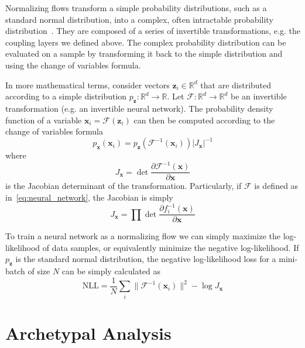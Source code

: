 Normalizing flows transform a simple probability distributions, such as a
standard normal distribution, into a complex, often intractable probability
distribution~\citep{kobyzevNormalizingFlowsIntroduction2020}. They are composed
of a series of invertible transformations, e.g. the coupling layers we defined
above. The complex probability distribution can be evaluated on a sample by
transforming it back to the simple distribution and using the change of
variables formula.

In more mathematical terms, consider vectors $\mathbf{z}_i \in \mathbb{R}^d$
that are distributed according to a simple distribution $p_{\mathbf{z}}:
\mathbb{R}^d \rightarrow \mathbb{R}$. Let $\mathcal{F}: \mathbb{R}^d
\rightarrow \mathbb{R}^d$ be an invertible transformation (e.g. an invertible
neural network). The probability density function of a variable $\mathbf{x}_i =
\mathcal{F} (\mathbf{z}_i)$ can then be computed according to the change of
variables formula
\begin{equation}%
    \label{eq:change_of_variables}
    p_{\mathbf{x}}(\mathbf{x}_i) =
    p_{\mathbf{z}}(\mathcal{F}^{-1}(\mathbf{x}_i)) \lvert J_{\mathbf{x}} \rvert^{-1}
\end{equation}
where
\begin{equation}%
    \label{eq:jacobian_det}
    J_{\mathbf{x}} = \det \frac{\partial \mathcal{F}^{-1} (\mathbf{x})}{\partial \mathbf{x}}
\end{equation}
is the Jacobian determinant of the transformation. Particularly, if
$\mathcal{F}$ is defined as in~\autoref{eq:neural_network}, the Jacobian is
simply
\begin{equation}%
    \label{eq:jacobian_chain_rule}
    J_{\mathbf{x}} = \prod \det \frac{\partial f_i^{-1} (\mathbf{x})}{\partial \mathbf{x}}
\end{equation}

To train a neural network as a normalizing flow we can simply maximize the
log-likelihood of data samples, or equivalently minimize the negative
log-likelihood. If $p_{\mathbf{z}}$ is the standard normal
distribution, the negative log-likelihood loss for a mini-batch of size $N$ can
be simply calculated as
\begin{equation}%
    \label{eq:nll_loss}
    \mathrm{NLL} = \frac{1}{N} \sum_i \lVert \mathcal{F}^{-1} (\mathbf{x}_i) \rVert^2 - \log J_{\mathbf{x}}
\end{equation}


\section{Archetypal Analysis}%
\label{sec:archetypal_analysis}

